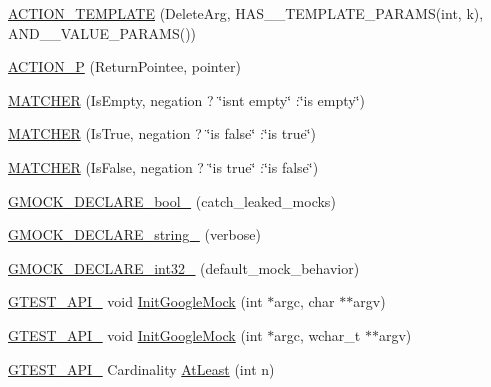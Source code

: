 \begin{DoxyCompactItemize}
\item 
\mbox{\hyperlink{namespacetesting_a37a5ebfe68fd8dedf8bd82a5ebddcb7b}{A\+C\+T\+I\+O\+N\+\_\+\+T\+E\+M\+P\+L\+A\+TE}} (Delete\+Arg, H\+A\+S\+\_\+\_\+\+T\+E\+M\+P\+L\+A\+T\+E\+\_\+\+P\+A\+R\+A\+MS(int, k), A\+N\+D\+\_\+\_\+\+V\+A\+L\+U\+E\+\_\+\+P\+A\+R\+A\+MS())
\item 
\mbox{\hyperlink{namespacetesting_a3d58f0d746946064154cd257d368599d}{A\+C\+T\+I\+O\+N\+\_\+P}} (Return\+Pointee, pointer)
\item 
\mbox{\hyperlink{namespacetesting_a4fcb3f407119590471bea5a90a8d2dda}{M\+A\+T\+C\+H\+ER}} (Is\+Empty, negation ? \char`\"{}isn\textquotesingle{}t empty\char`\"{} \+:\char`\"{}is empty\char`\"{})
\item 
\mbox{\hyperlink{namespacetesting_ab2b645db6909220993662cf43ed0d9e8}{M\+A\+T\+C\+H\+ER}} (Is\+True, negation ? \char`\"{}is false\char`\"{} \+:\char`\"{}is true\char`\"{})
\item 
\mbox{\hyperlink{namespacetesting_a03fb223cceaefc67991ac36286dcbb34}{M\+A\+T\+C\+H\+ER}} (Is\+False, negation ? \char`\"{}is true\char`\"{} \+:\char`\"{}is false\char`\"{})
\item 
\mbox{\hyperlink{namespacetesting_a9dd7591091234b86ce48ce1aff6feeb5}{G\+M\+O\+C\+K\+\_\+\+D\+E\+C\+L\+A\+R\+E\+\_\+bool\+\_\+}} (catch\+\_\+leaked\+\_\+mocks)
\item 
\mbox{\hyperlink{namespacetesting_a4dd099d1d538f26a16fcc2f94011b37e}{G\+M\+O\+C\+K\+\_\+\+D\+E\+C\+L\+A\+R\+E\+\_\+string\+\_\+}} (verbose)
\item 
\mbox{\hyperlink{namespacetesting_a8db48e64b7ad3536f6ccf28ce39f9111}{G\+M\+O\+C\+K\+\_\+\+D\+E\+C\+L\+A\+R\+E\+\_\+int32\+\_\+}} (default\+\_\+mock\+\_\+behavior)
\item 
\mbox{\hyperlink{gtest-port_8h_aa73be6f0ba4a7456180a94904ce17790}{G\+T\+E\+S\+T\+\_\+\+A\+P\+I\+\_\+}} void \mbox{\hyperlink{namespacetesting_a32b1c6db9ba5133ccabfa67616b3c041}{Init\+Google\+Mock}} (int $\ast$argc, char $\ast$$\ast$argv)
\item 
\mbox{\hyperlink{gtest-port_8h_aa73be6f0ba4a7456180a94904ce17790}{G\+T\+E\+S\+T\+\_\+\+A\+P\+I\+\_\+}} void \mbox{\hyperlink{namespacetesting_a20fb86152763dddef67bc1dd8b090800}{Init\+Google\+Mock}} (int $\ast$argc, wchar\+\_\+t $\ast$$\ast$argv)
\item 
\mbox{\hyperlink{gtest-port_8h_aa73be6f0ba4a7456180a94904ce17790}{G\+T\+E\+S\+T\+\_\+\+A\+P\+I\+\_\+}} Cardinality \mbox{\hyperlink{namespacetesting_a137297cb3c582843989fbd937cf0fed2}{At\+Least}} (int n)
\item 

\end{DoxyCompactItemize}
